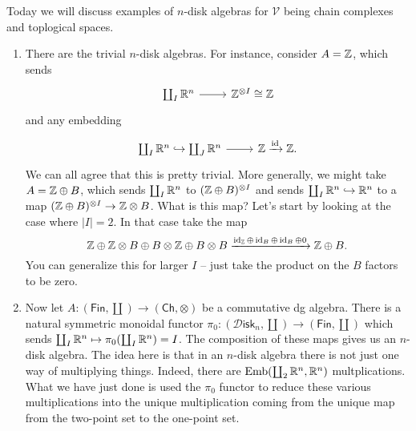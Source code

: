 \documentclass{amsart}
\DeclareMathOperator{\Emb}{Emb}
\newcommand{\Disk}{\mathscr{D}\mathsf{isk}_n}
\begin{document}
Today we will discuss examples of $n$-disk algebras for $\mathcal{V}$ being chain
complexes and toplogical spaces.
\begin{enumerate}
    \item There are the trivial $n$-disk algebras. For instance, consider $A=\mathbb{Z}$, which 
        sends
        \begin{equation*}
            \begin{tikzcd}
                \coprod_I \R^n \rar & \Z^{\otimes I}\cong \Z
            \end{tikzcd}
        \end{equation*}
        and any embedding
        \begin{equation*}
            \begin{tikzcd}
                \coprod_I \R^n \hookrightarrow \coprod_J \R^n \rar & \Z \xrightarrow{\id}\Z.
            \end{tikzcd}
        \end{equation*}
        We can all agree that this is pretty trivial. More generally, we might take $A=\mathbb{Z}\oplus B$,
        which sends $\coprod_I\mathbb{R}^n$ to $(\mathbb{Z}\oplus B)^{\otimes I}$ and sends $\coprod_I\mathbb{R}^n\hookrightarrow\mathbb{R}^n$
        to a map $(\mathbb{Z}\oplus B)^{\otimes I}\to \mathbb{Z}\otimes B$. What is this map? Let's start by looking at
        the case where $|I|=2$. In that case take the map
        \begin{equation*}
            \mathbb{Z}\oplus \mathbb{Z}\otimes B\oplus B\otimes\mathbb{Z} \oplus B\otimes B \xrightarrow{\operatorname{id}_{\mathbb{Z}}\oplus\operatorname{id}_B\oplus\operatorname{id}_B\oplus 0} \mathbb{Z}\oplus B.
        \end{equation*}
        You can generalize this for larger $I$ -- just take the product on the $B$ factors to be zero.

    \item Now let $A:(\mathsf{Fin},\coprod) \to(\mathsf{Ch},\otimes)$ be a commutative dg algebra.
        There is a natural symmetric monoidal functor $\pi_0:(\Disk,\coprod)\to (\mathsf{Fin},\coprod)$
        which sends
        $\coprod_I\mathbb{R}^n\mapsto\pi_0(\coprod_I\mathbb{R}^n)=I$. The composition of these maps gives us
        an $n$-disk algebra. The idea here is that in an $n$-disk algebra there is not just
        one way of multiplying things. Indeed, there are $\Emb(\coprod_2\R^n,\R^n)$ multplications.
        What we have just done is used the $\pi_0$ functor to reduce these various multiplications
        into the unique multiplication coming from the unique map from the two-point set to the
        one-point set.


\end{enumerate}
\end{document}
